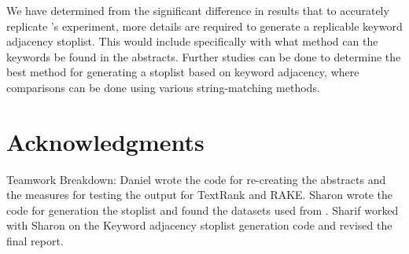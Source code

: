 \documentclass[11pt,a4paper]{article}
\begin{document}
We have determined from the significant difference in results that to accurately replicate \citet{1}'s experiment, more details are required to generate a replicable keyword adjacency stoplist. This would include specifically with what method can the keywords be found in the abstracts. Further studies can be done to determine the best method for generating a stoplist based on keyword adjacency, where comparisons can be done using various string-matching methods.

\section{Acknowledgments}

Teamwork Breakdown: Daniel wrote the code for re-creating the abstracts and the measures for testing the output for TextRank and RAKE. Sharon wrote the code for generation the stoplist and found the datasets used from \citet{hulth-2003-improved}. Sharif worked with Sharon on the Keyword adjacency stoplist generation code and revised the final report. 
 

%
%




\end{document}
